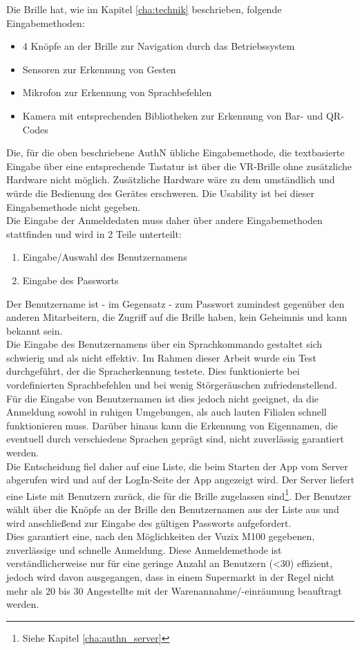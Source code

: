 Die Brille hat, wie im Kapitel \ref{cha:technik} beschrieben, folgende Eingabemethoden:
\begin{itemize}
	\item 4 Knöpfe an der Brille zur Navigation durch das Betriebssystem
	\item Sensoren zur Erkennung von Gesten
	\item Mikrofon zur Erkennung von Sprachbefehlen
	\item Kamera mit entsprechenden Bibliotheken zur Erkennung von Bar- und QR-Codes
\end{itemize}
Die, für die oben beschriebene \acf{AuthN} übliche Eingabemethode, die textbasierte Eingabe über eine entsprechende Tastatur ist über die \ac{VR}-Brille ohne zusätzliche Hardware nicht möglich. Zusätzliche Hardware wäre zu dem umständlich und würde die Bedienung des Gerätes erschweren. Die Usability ist bei dieser Eingabemethode nicht gegeben.\\

Die Eingabe der Anmeldedaten muss daher über andere Eingabemethoden stattfinden und wird in 2 Teile unterteilt:
\begin{enumerate}
	\item Eingabe/Auswahl des Benutzernamens
	\item Eingabe des Passworts
\end{enumerate}

Der Benutzername ist - im Gegensatz - zum Passwort zumindest gegenüber den anderen Mitarbeitern, die Zugriff auf die Brille haben, kein Geheimnis und kann bekannt sein.\\
Die Eingabe des Benutzernamens über ein Sprachkommando gestaltet sich schwierig und als nicht effektiv. Im Rahmen dieser Arbeit wurde ein Test durchgeführt, der die Spracherkennung testete. Dies funktionierte bei vordefinierten Sprachbefehlen und bei wenig Störgeräuschen zufriedenstellend. Für die Eingabe von Benutzernamen ist dies jedoch nicht geeignet, da die Anmeldung sowohl in ruhigen Umgebungen, als auch lauten Filialen schnell funktionieren muss. Darüber hinaus kann die Erkennung von Eigennamen, die eventuell durch verschiedene Sprachen geprägt sind, nicht zuverlässig garantiert werden.\\
Die Entscheidung fiel daher auf eine Liste, die beim Starten der App vom Server abgerufen wird und auf der LogIn-Seite der App angezeigt wird. Der Server liefert eine Liste mit Benutzern zurück, die für die Brille zugelassen sind\footnote{Siehe Kapitel \ref{cha:authn_server} }. Der Benutzer wählt über die Knöpfe an der Brille den Benutzernamen aus der Liste aus und wird anschließend zur Eingabe des gültigen Passworts aufgefordert.\\
Dies garantiert eine, nach den Möglichkeiten der Vuzix M100 gegebenen, zuverlässige und schnelle Anmeldung. Diese Anmeldemethode ist verständlicherweise nur für eine geringe Anzahl an Benutzern (<30) effizient, jedoch wird davon ausgegangen, dass in einem Supermarkt in der Regel nicht mehr als 20 bis 30 Angestellte mit der Warenannahme/-einräumung beauftragt werden.\\

